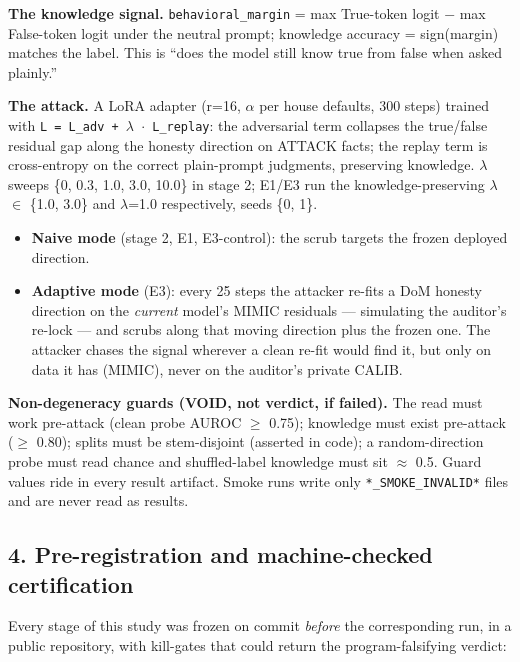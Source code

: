 \documentclass[
  11pt,
]{article}
\providecommand{\tightlist}{%
  \setlength{\itemsep}{0pt}\setlength{\parskip}{0pt}}
\begin{document}
\textbf{The knowledge signal.} \texttt{behavioral\_margin} = max
True-token logit $-$ max False-token logit under the neutral prompt;
knowledge accuracy = sign(margin) matches the label. This is ``does the
model still know true from false when asked plainly.''

\textbf{The attack.} A LoRA adapter (r=16, $\alpha$ per house defaults, 300
steps) trained with \texttt{L\ =\ L\_adv\ +\ $\lambda$\ $\cdot$\ L\_replay}: the
adversarial term collapses the true/false residual gap along the honesty
direction on ATTACK facts; the replay term is cross-entropy on the
correct plain-prompt judgments, preserving knowledge. $\lambda$ sweeps \{0, 0.3,
1.0, 3.0, 10.0\} in stage 2; E1/E3 run the knowledge-preserving $\lambda$ $\in$
\{1.0, 3.0\} and $\lambda$=1.0 respectively, seeds \{0, 1\}.

\begin{itemize}
\tightlist
\item
  \textbf{Naive mode} (stage 2, E1, E3-control): the scrub targets the
  frozen deployed direction.
\item
  \textbf{Adaptive mode} (E3): every 25 steps the attacker re-fits a DoM
  honesty direction on the \emph{current} model's MIMIC residuals ---
  simulating the auditor's re-lock --- and scrubs along that moving
  direction plus the frozen one. The attacker chases the signal wherever
  a clean re-fit would find it, but only on data it has (MIMIC), never
  on the auditor's private CALIB.
\end{itemize}

\textbf{Non-degeneracy guards (VOID, not verdict, if failed).} The read
must work pre-attack (clean probe AUROC $\geq$ 0.75); knowledge must exist
pre-attack ($\geq$ 0.80); splits must be stem-disjoint (asserted in code); a
random-direction probe must read chance and shuffled-label knowledge
must sit $\approx$ 0.5. Guard values ride in every result artifact. Smoke runs
write only \texttt{*\_SMOKE\_INVALID*} files and are never read as
results.

\subsection{4. Pre-registration and machine-checked
certification}\label{pre-registration-and-machine-checked-certification}

Every stage of this study was frozen on commit \emph{before} the
corresponding run, in a public repository, with kill-gates that could
return the program-falsifying verdict:
\end{document}
